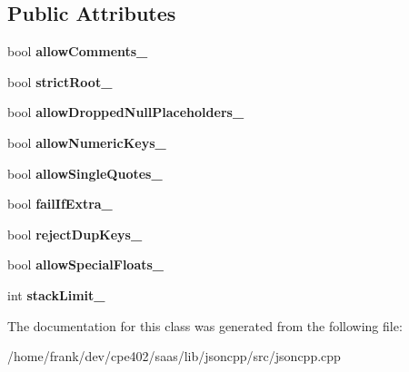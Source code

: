 \subsection*{Public Attributes}
\begin{DoxyCompactItemize}
\item 
\hypertarget{class_json_1_1_our_features_ac71bb7ba7363d3b05ed76602b036ce33}{}bool {\bfseries allow\+Comments\+\_\+}\label{class_json_1_1_our_features_ac71bb7ba7363d3b05ed76602b036ce33}

\item 
\hypertarget{class_json_1_1_our_features_a2095f66a776c0a4ae6cc931a0c94242e}{}bool {\bfseries strict\+Root\+\_\+}\label{class_json_1_1_our_features_a2095f66a776c0a4ae6cc931a0c94242e}

\item 
\hypertarget{class_json_1_1_our_features_a13963bc44bf948eec1968f7ff8e8f5f1}{}bool {\bfseries allow\+Dropped\+Null\+Placeholders\+\_\+}\label{class_json_1_1_our_features_a13963bc44bf948eec1968f7ff8e8f5f1}

\item 
\hypertarget{class_json_1_1_our_features_af6973fc7e774ce2d634ba99442aeb91a}{}bool {\bfseries allow\+Numeric\+Keys\+\_\+}\label{class_json_1_1_our_features_af6973fc7e774ce2d634ba99442aeb91a}

\item 
\hypertarget{class_json_1_1_our_features_abbd6c196d7a22e2a360a59887eda4610}{}bool {\bfseries allow\+Single\+Quotes\+\_\+}\label{class_json_1_1_our_features_abbd6c196d7a22e2a360a59887eda4610}

\item 
\hypertarget{class_json_1_1_our_features_ae8ad25b90706c78f1a8fe929191ac61b}{}bool {\bfseries fail\+If\+Extra\+\_\+}\label{class_json_1_1_our_features_ae8ad25b90706c78f1a8fe929191ac61b}

\item 
\hypertarget{class_json_1_1_our_features_a39b8e0b86b1c24a45e800c023bb715aa}{}bool {\bfseries reject\+Dup\+Keys\+\_\+}\label{class_json_1_1_our_features_a39b8e0b86b1c24a45e800c023bb715aa}

\item 
\hypertarget{class_json_1_1_our_features_af760f91cc2a7af37e44f78fb466061bb}{}bool {\bfseries allow\+Special\+Floats\+\_\+}\label{class_json_1_1_our_features_af760f91cc2a7af37e44f78fb466061bb}

\item 
\hypertarget{class_json_1_1_our_features_a9a786713902d14be6d57a08cc03ccfff}{}int {\bfseries stack\+Limit\+\_\+}\label{class_json_1_1_our_features_a9a786713902d14be6d57a08cc03ccfff}

\end{DoxyCompactItemize}


The documentation for this class was generated from the following file\+:\begin{DoxyCompactItemize}
\item 
/home/frank/dev/cpe402/saas/lib/jsoncpp/src/jsoncpp.\+cpp\end{DoxyCompactItemize}
